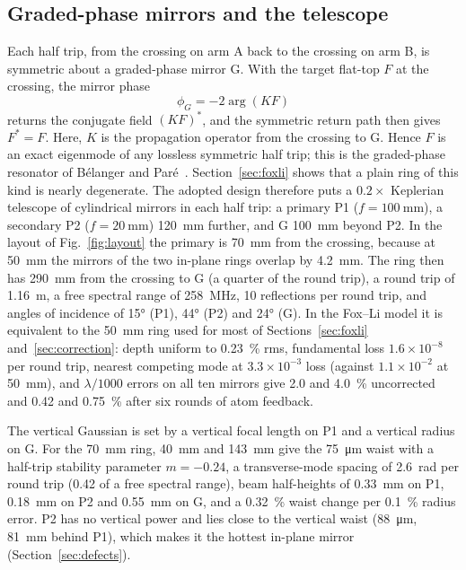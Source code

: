 \documentclass[11pt]{article}
\begin{document}
\subsection{Graded-phase mirrors and the telescope}

Each half trip, from the crossing on arm A back to the crossing on arm B, is symmetric about a
graded-phase mirror G. With the target flat-top $F$ at the crossing, the mirror phase
\begin{equation}
  \phi_G = -2 \arg(K F)
  \label{eq:graded}
\end{equation}
returns the conjugate field $(KF)^{*}$, and the symmetric return path then gives $F^{*} = F$. Here,
$K$ is the propagation operator from the crossing to G. Hence $F$ is an exact eigenmode of any
lossless symmetric half trip; this is the graded-phase resonator of B\'elanger and
Par\'e~\cite{Belanger1991}. Section~\ref{sec:foxli} shows that a plain ring of this kind is nearly
degenerate. The adopted design therefore puts a $0.2\times$ Keplerian telescope of cylindrical
mirrors in each half trip: a primary P1 ($f = \SI{100}{\milli\metre}$), a secondary P2
($f = \SI{20}{\milli\metre}$) \SI{120}{\milli\metre} further, and G \SI{100}{\milli\metre} beyond P2.
In the layout of Fig.~\ref{fig:layout} the primary is \SI{70}{\milli\metre} from the crossing,
because at \SI{50}{\milli\metre} the mirrors of the two in-plane rings overlap by \SI{4.2}{\milli\metre}.
The ring then has \SI{290}{\milli\metre} from the crossing to G (a quarter of the round trip), a round trip of \SI{1.16}{\metre}, a free
spectral range of \SI{258}{\mega\hertz}, 10 reflections per round trip, and angles of incidence of
\ang{15} (P1), \ang{44} (P2) and \ang{24} (G). In the Fox--Li model it is equivalent to the
\SI{50}{\milli\metre} ring used for most of Sections~\ref{sec:foxli} and~\ref{sec:correction}: depth
uniform to \SI{0.23}{\percent} rms, fundamental loss $1.6\times10^{-8}$ per round trip, nearest
competing mode at $3.3\times10^{-3}$ loss (against $1.1\times10^{-2}$ at \SI{50}{\milli\metre}), and
$\lambda/1000$ errors on all ten mirrors give 2.0 and \SI{4.0}{\percent} uncorrected and 0.42 and
\SI{0.75}{\percent} after six rounds of atom feedback.

The vertical Gaussian is set by a vertical focal length on P1 and a vertical radius on G. For the
\SI{70}{\milli\metre} ring, \SI{40}{\milli\metre} and \SI{143}{\milli\metre} give the
\SI{75}{\micro\metre} waist with a half-trip stability parameter $m = -0.24$, a transverse-mode spacing
of \SI{2.6}{\radian} per round trip (0.42 of a free spectral range), beam half-heights of
\SI{0.33}{\milli\metre} on P1, \SI{0.18}{\milli\metre} on P2 and \SI{0.55}{\milli\metre} on G, and a
\SI{0.32}{\percent} waist change per \SI{0.1}{\percent} radius error. P2 has no vertical power and lies
close to the vertical waist (\SI{88}{\micro\metre}, \SI{81}{\milli\metre} behind P1), which makes it the
hottest in-plane mirror (Section~\ref{sec:defects}).
\end{document}
